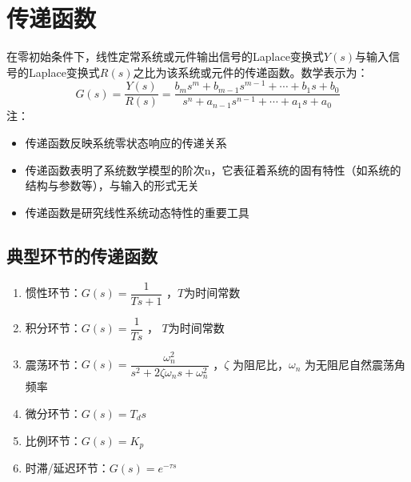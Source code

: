 \section{传递函数}
\begin{definition}[传递函数]
    在零初始条件下，线性定常系统或元件输出信号的Laplace变换式$Y(s)$与输入信号的Laplace变换式$R(s)$之比为该系统或元件的传递函数。数学表示为：
    \begin{equation*}
        G(s) = \frac{Y(s)}{R(s)} = \frac{b_m s^m + b_{m-1} s^{m-1} + \cdots + b_1 s +b_0}{s^n + a_{n-1} s^{n-1}+\cdots + a_1 s +a_0}
    \end{equation*}
    注：
    \begin{itemize}
        \item 传递函数反映系统零状态响应的传递关系
        \item 传递函数表明了系统数学模型的阶次n，它表征着系统的固有特性（如系统的结构与参数等），与输入的形式无关
        \item 传递函数是研究线性系统动态特性的重要工具
    \end{itemize}

\end{definition}


\subsection{典型环节的传递函数}
\begin{enumerate}
    \item 惯性环节：$G(s) = \dfrac{1}{Ts+1}$ ，$T$为时间常数
    \item 积分环节：$G(s) = \dfrac{1}{Ts}$ ， $T$为时间常数
    \item 震荡环节：$G(s) = \dfrac{\omega_n^2}{s^2 + 2\zeta \omega_n s + \omega_n^2}$ ，$\zeta$ 为阻尼比，$\omega_n$ 为无阻尼自然震荡角频率
    \item 微分环节：$G(s) = T_d s$
    \item 比例环节：$G(s) = K_p$
    \item 时滞/延迟环节：$G(s) = e^{-\tau s}$ 
\end{enumerate}

